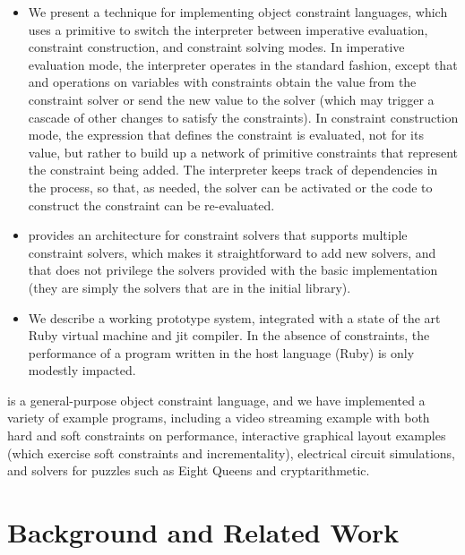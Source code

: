 \begin{itemize}
\item We present a technique for implementing object constraint
  languages, which uses a primitive to switch the interpreter between
  imperative evaluation, constraint construction, and constraint
  solving modes.  In imperative evaluation mode, the interpreter
  operates in the standard fashion, except that \load and \store
  operations on variables with constraints obtain the value from the
  constraint solver or send the new value to the solver (which may
  trigger a cascade of other changes to satisfy the constraints).  In
  constraint construction mode, the expression that defines the
  constraint is evaluated, not for its value, but rather to build up a
  network of primitive constraints that represent the constraint being
  added.  The interpreter keeps track of dependencies in the process,
  so that, as needed, the solver can be activated or the code to
  construct the constraint can be re-evaluated.
\item \langname provides an architecture for constraint solvers that
  supports multiple constraint solvers, which makes it straightforward
  to add new solvers, and that does not privilege the solvers provided
  with the basic implementation (they are simply the solvers that are
  in the initial library).
\item We describe a working prototype system, integrated with a state
  of the art Ruby virtual machine and \ac{jit} compiler. In the
  absence of constraints, the performance of a program written in the
  host language (Ruby) is only modestly impacted.
\end{itemize}

\toolname is a general-purpose object constraint language, and we have
implemented a variety of example programs, including a video streaming
example with both hard and soft constraints on performance,
interactive graphical layout examples (which exercise soft constraints
and incrementality), electrical circuit simulations, and solvers for
puzzles such as Eight Queens and cryptarithmetic.

\section{Background and Related Work}
\label{sec:background-related-work}


